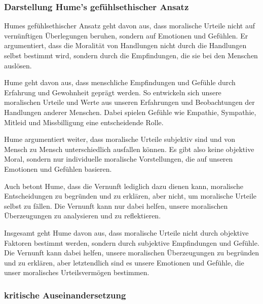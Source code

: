 \documentclass{article}
\begin{document}
\subsubsection*{Darstellung Hume's gefühlsethischer Ansatz}
Humes gefühlsethischer Ansatz geht davon aus, dass moralische Urteile nicht auf
vernünftigen Überlegungen beruhen, sondern auf Emotionen und Gefühlen. Er
argumentiert, dass die Moralität von Handlungen nicht durch die Handlungen
selbst bestimmt wird, sondern durch die Empfindungen, die sie bei den Menschen
auslösen.

Hume geht davon aus, dass menschliche Empfindungen und Gefühle durch Erfahrung
und Gewohnheit geprägt werden. So entwickeln sich unsere moralischen Urteile und
Werte aus unseren Erfahrungen und Beobachtungen der Handlungen anderer Menschen.
Dabei spielen Gefühle wie Empathie, Sympathie, Mitleid und Missbilligung eine
entscheidende Rolle.

Hume argumentiert weiter, dass moralische Urteile subjektiv sind und von Mensch
zu Mensch unterschiedlich ausfallen können. Es gibt also keine objektive Moral,
sondern nur individuelle moralische Vorstellungen, die auf unseren Emotionen und
Gefühlen basieren.

Auch betont Hume, dass die Vernunft lediglich dazu dienen kann, moralische
Entscheidungen zu begründen und zu erklären, aber nicht, um moralische Urteile
selbst zu fällen. Die Vernunft kann nur dabei helfen, unsere moralischen
Überzeugungen zu analysieren und zu reflektieren.

Insgesamt geht Hume davon aus, dass moralische Urteile nicht durch objektive
Faktoren bestimmt werden, sondern durch subjektive Empfindungen und Gefühle. Die
Vernunft kann dabei helfen, unsere moralischen Überzeugungen zu begründen und zu
erklären, aber letztendlich sind es unsere Emotionen und Gefühle, die unser
moralisches Urteilsvermögen bestimmen.


\subsubsection*{kritische Auseinandersetzung}
\end{document}
